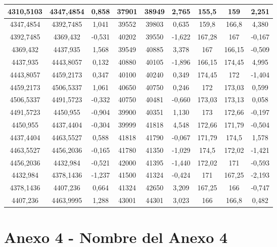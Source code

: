 \documentclass[12pt,letter,spanish]{article}
\begin{document}
\begin{table}[H]
\begin{tabular}{|c|c|c|c|c|c|c|c|c|}
4310,5103 & 4347,4854 & 0,858 & 37901 & 38949 & 2,765 & 155,5 & 159 & 2,251 \\ \hline
4347,4854 & 4392,7485 & 1,041 & 39552 & 39803 & 0,635 & 159,8 & 166,8 & 4,380 \\ \hline
4392,7485 & 4369,432 & -0,531 & 40202 & 39550 & -1,622 & 167,28 & 167 & -0,167 \\ \hline
4369,432 & 4437,935 & 1,568 & 39549 & 40885 & 3,378 & 167 & 166,15 & -0,509 \\ \hline
4437,935 & 4443,8057 & 0,132 & 40880 & 40105 & -1,896 & 166,15 & 174,45 & 4,995 \\ \hline
4443,8057 & 4459,2173 & 0,347 & 40100 & 40240 & 0,349 & 174,45 & 172 & -1,404 \\ \hline
4459,2173 & 4506,5337 & 1,061 & 40650 & 40750 & 0,246 & 172 & 173,03 & 0,599 \\ \hline
4506,5337 & 4491,5723 & -0,332 & 40750 & 40481 & -0,660 & 173,03 & 173,13 & 0,058 \\ \hline
4491,5723 & 4450,955 & -0,904 & 39900 & 40351 & 1,130 & 173 & 172,66 & -0,197 \\ \hline
4450,955 & 4437,4404 & -0,304 & 39999 & 41818 & 4,548 & 172,66 & 171,79 & -0,504 \\ \hline
4437,4404 & 4463,5527 & 0,588 & 41818 & 41790 & -0,067 & 171,79 & 174,5 & 1,578 \\ \hline
4463,5527 & 4456,2036 & -0,165 & 41780 & 41350 & -1,029 & 174,5 & 172,02 & -1,421 \\ \hline
4456,2036 & 4432,984 & -0,521 & 42000 & 41395 & -1,440 & 172,02 & 171 & -0,593 \\ \hline
4432,984 & 4378,1436 & -1,237 & 41500 & 41324 & -0,424 & 171 & 167,25 & -2,193 \\ \hline
4378,1436 & 4407,236 & 0,664 & 41324 & 42650 & 3,209 & 167,25 & 166 & -0,747 \\ \hline
4407,236 & 4463,9995 & 1,288 & 43001 & 44301 & 3,023 & 166 & 166,8 & 0,482 \\ \hline
\end{tabular}
\centering
\end{table}

\newpage

\section*{\centering Anexo 4 - Nombre del Anexo 4}
\end{document}
